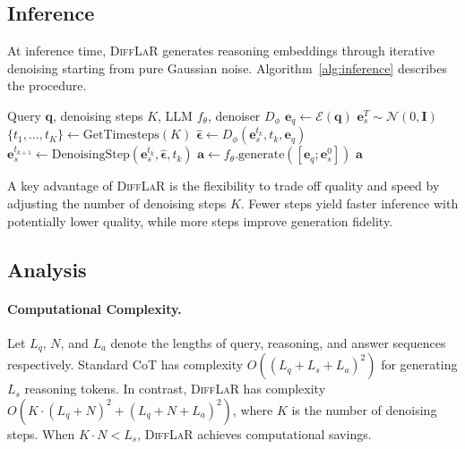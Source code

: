 \documentclass{article}
\newcommand{\difflar}{\textsc{DiffLaR}}
\newcommand{\mcE}{\mathcal{E}}
\newcommand{\mcN}{\mathcal{N}}
\newcommand{\be}{\mathbf{e}}
\newcommand{\bq}{\mathbf{q}}
\newcommand{\ba}{\mathbf{a}}
\begin{document}
\subsection{Inference}
\label{sec:inference}

At inference time, \difflar{} generates reasoning embeddings through iterative denoising starting from pure Gaussian noise. Algorithm~\ref{alg:inference} describes the procedure.

\begin{algorithm}[t]
\caption{\difflar{} Inference}
\label{alg:inference}
\begin{algorithmic}[1]
\REQUIRE Query $\bq$, denoising steps $K$, LLM $f_\theta$, denoiser $D_\phi$
\STATE $\be_q \leftarrow \mcE(\bq)$ 
\STATE $\be_s^T \sim \mcN(0, \mathbf{I})$ 
\STATE $\{t_1, \ldots, t_K\} \leftarrow \text{GetTimesteps}(K)$
    \STATE $\hat{\bm{\epsilon}} \leftarrow D_\phi(\be_s^{t_k}, t_k, \be_q)$
    \STATE $\be_s^{t_{k+1}} \leftarrow \text{DenoisingStep}(\be_s^{t_k}, \hat{\bm{\epsilon}}, t_k)$
\ENDFOR
\STATE $\ba \leftarrow f_\theta.\text{generate}([\be_q; \be_s^0])$
\RETURN $\ba$
\end{algorithmic}
\end{algorithm}

A key advantage of \difflar{} is the flexibility to trade off quality and speed by adjusting the number of denoising steps $K$. Fewer steps yield faster inference with potentially lower quality, while more steps improve generation fidelity.

\subsection{Analysis}
\label{sec:analysis}

\paragraph{Computational Complexity.}
Let $L_q$, $N$, and $L_a$ denote the lengths of query, reasoning, and answer sequences respectively. Standard CoT has complexity $O((L_q + L_s + L_a)^2)$ for generating $L_s$ reasoning tokens. In contrast, \difflar{} has complexity $O(K \cdot (L_q + N)^2 + (L_q + N + L_a)^2)$, where $K$ is the number of denoising steps. When $K \cdot N < L_s$, \difflar{} achieves computational savings.
\end{document}
